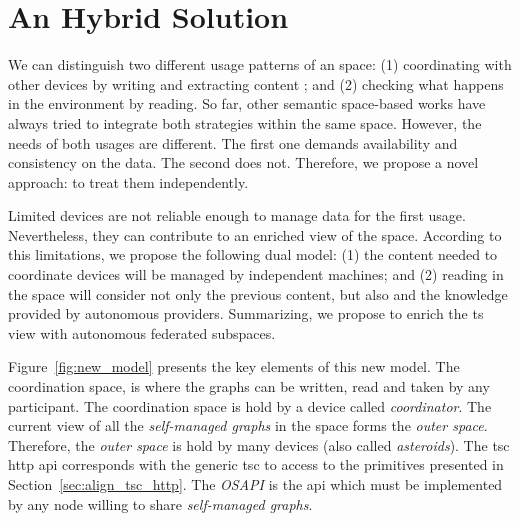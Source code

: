 \section{An Hybrid Solution} %
\label{sec:hybrid_solution}

We can distinguish two different usage patterns of an space:
(1) coordinating with other devices by writing and extracting content ; and %
(2) checking what happens in the environment by reading.
So far, other semantic space-based works have always tried to integrate both strategies within the same space.
However, the needs of both usages are different.
The first one demands availability and consistency on the data.
The second does not. %
Therefore, we propose a novel approach: to treat them independently.


Limited devices are not reliable enough to manage data for the first usage.
Nevertheless, they can contribute to an enriched view of the space.
According to this limitations, we propose the following dual model:
(1) the content needed to coordinate devices will be managed by independent machines; and
(2) reading in the space will consider not only the previous content, but also and the knowledge provided by autonomous providers.
Summarizing, we propose to enrich the \ac{ts} view with autonomous federated subspaces.


Figure~\ref{fig:new_model} presents the key elements of this new model.
The coordination space, is where the graphs can be written, read and taken by any participant.
The coordination space is hold by a device called \emph{coordinator}.
The current view of all the \emph{self-managed graphs} in the space forms the \emph{outer space}.
Therefore, the \emph{outer space} is hold by many devices (also called \emph{asteroids}).
The \ac{tsc} \ac{http} \ac{api} corresponds with the generic \ac{tsc} to access to the primitives presented in Section~\ref{sec:align_tsc_http}.
The \emph{OSAPI} is the \ac{api} which must be implemented by any node willing to share \emph{self-managed graphs}.



